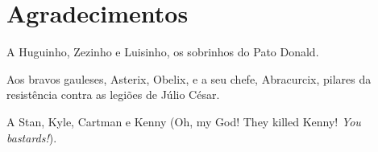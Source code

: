 
\chapter*{Agradecimentos}

\noindent A Huguinho, Zezinho e Luisinho, os sobrinhos do Pato Donald.

\noindent  Aos  bravos  gauleses,  Asterix,  Obelix, e  a  seu  chefe,
Abracurcix, pilares da resistência contra as legiões de Júlio César.

\noindent  A Stan, Kyle,  Cartman e  Kenny (Oh,  my God!   They killed
Kenny! {\em You bastards!}).

